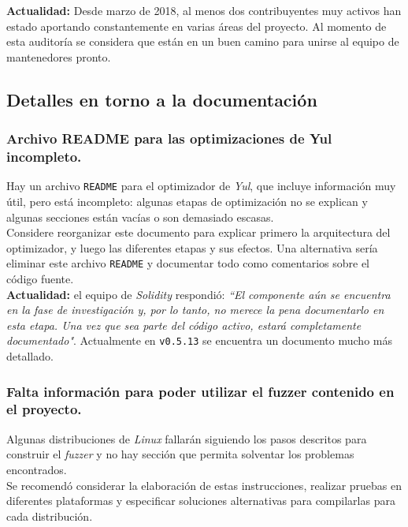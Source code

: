 \textbf{Actualidad:} Desde marzo de 2018\cite{GHContributors2}, al menos dos contribuyentes muy activos han estado aportando constantemente en varias áreas del proyecto. Al momento de esta auditoría se considera que están en un buen camino para unirse al equipo de mantenedores pronto.\\

\subsection{Detalles en torno a la documentación}

\subsubsection{Archivo README para las optimizaciones de Yul incompleto.}
Hay un archivo \texttt{README}\cite{GHLibjuliaReadme} para el optimizador de \textit{Yul}, que incluye información muy útil, pero está incompleto: algunas etapas de optimización no se explican y algunas secciones están vacías o son demasiado escasas.\\

Considere reorganizar este documento para explicar primero la arquitectura del optimizador, y luego las diferentes etapas y sus efectos. Una alternativa sería eliminar este archivo \texttt{README} y documentar todo como comentarios sobre el código fuente.\\

\textbf{Actualidad:} el equipo de \textit{Solidity} respondió: \textit{``El componente aún se encuentra en la fase de investigación y, por lo tanto, no merece la pena documentarlo en esta etapa. Una vez que sea parte del código activo, estará completamente documentado"}. Actualmente en \texttt{v0.5.13} se encuentra un documento\cite{GHYulReadme} mucho más detallado.\\

\subsubsection{Falta información para poder utilizar el fuzzer contenido en el proyecto.}

Algunas distribuciones de \textit{Linux} fallarán siguiendo los pasos descritos para construir el \textit{fuzzer} y no hay sección que permita solventar los problemas encontrados.\\

Se recomendó considerar la elaboración de estas instrucciones, realizar pruebas en diferentes plataformas y especificar soluciones alternativas para compilarlas para cada distribución.\\

